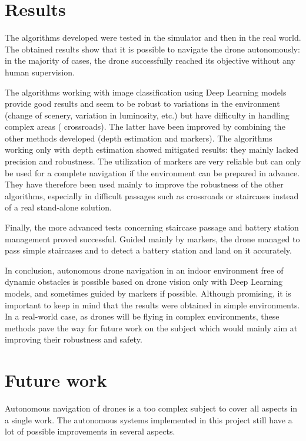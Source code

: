 \section{Results}

The algorithms developed were tested in the simulator and then in the real world. The obtained results show that it is possible to navigate the drone autonomously: in the majority of cases, the drone successfully reached its objective without any human supervision.

The algorithms working with image classification using Deep Learning models provide good results and seem to be robust to variations in the environment (change of scenery, variation in luminosity, etc.) but have difficulty in handling complex areas (\eg{} crossroads). The latter have been improved by combining the other methods developed (depth estimation and markers). The algorithms working only with depth estimation showed mitigated results: they mainly lacked precision and robustness. The utilization of markers are very reliable but can only be used for a complete navigation if the environment can be prepared in advance. They have therefore been used mainly to improve the robustness of the other algorithms, especially in difficult passages such as crossroads or staircases instead of a real stand-alone solution.

Finally, the more advanced tests concerning staircase passage and battery station management proved successful. Guided mainly by markers, the drone managed to pass simple staircases and to detect a battery station and land on it accurately.

In conclusion, autonomous drone navigation in an indoor environment free of dynamic obstacles is possible based on drone vision only with Deep Learning models, and sometimes guided by markers if possible. Although promising, it is important to keep in mind that the results were obtained in simple environments. In a real-world case, as drones will be flying in complex environments, these methods pave the way for future work on the subject which would mainly aim at improving their robustness and safety.

\section{Future work}

Autonomous navigation of drones is a too complex subject to cover all aspects in a single work. The autonomous systems implemented in this project still have a lot of possible improvements in several aspects.

